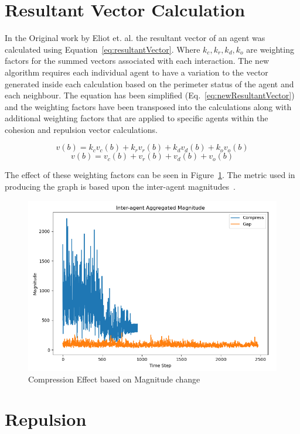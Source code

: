 \documentclass[12pt,a4paper]{article}
\begin{document}
\section{Resultant Vector Calculation}\label{resultantVector}
In the Original work by Eliot et. al. the resultant vector of an agent was calculated using Equation~\ref{eq:resultantVector}. Where $k_c,k_r,k_d,k_o$ are weighting factors for the summed vectors associated with each interaction. The new algorithm requires each individual agent to have a variation to the vector generated inside each calculation based on the perimeter status of the agent and each neighbour. The equation has been simplified (Eq.~\ref{eq:newResultantVector}) and the weighting factors have been transposed into the calculations along with additional weighting factors that are applied to specific agents within the cohesion and repulsion vector calculations.

\begin{equation}\label{eq:resultantVector}
	v(b) = k_cv_c(b) + k_rv_r(b) + k_dv_d(b) + k_ov_o(b)
\end{equation}
\begin{equation}\label{eq:newResultantVector}
	v(b) = v_c(b) + v_r(b) + v_d(b) + v_o(b)
\end{equation}

The effect of these weighting factors can be seen in Figure~\ref{fig:compressioneffect1}. The metric used in producing the graph is based upon the inter-agent magnitudes~\cite{eliot2018metric}.

\begin{figure}[H]
	\centering
	\includegraphics[width=0.7\linewidth]{figures/CompressionEffect1}
	\caption[Compression Effect]{Compression Effect based on Magnitude change}
	\label{fig:compressioneffect1}
\end{figure}

\section{Repulsion}\label{repulsion}
\end{document}
